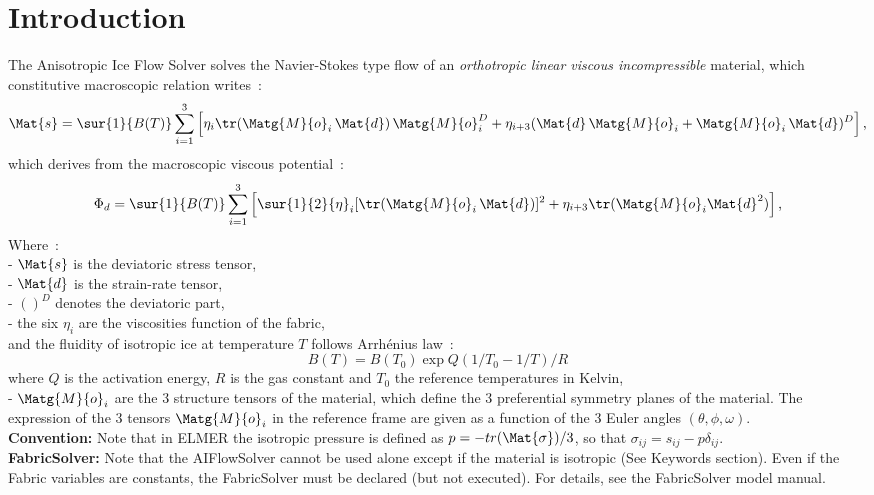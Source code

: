 \section{Introduction}
The Anisotropic Ice Flow Solver solves the Navier-Stokes type flow of an \textit{orthotropic linear viscous
incompressible } material, which constitutive macroscopic relation writes~:
\begin{equation} \label{polylawinv}
\Mat{s} = \sur{1}{{B}(T)} \sum_{i=1}^3 \left[ {\eta}_i \tr(\Matg{M}{o}_i \,\Mat{d}) \, \Matg{M}{o}_i^D + {\eta}_{i+3} (
\Mat{d} \, \Matg{M}{o}_i + \Matg{M}{o}_i \, \Mat{d})^D \right] \textrm{,}
\end{equation}
which derives from the macroscopic viscous potential~:
\begin{equation}
{\Phi}_d =  \sur{1}{{B}(T)} \sum_{i=1}^3 \left[ \sur{1}{2} {\eta}_i [\tr(\Matg{M}{o}_i \,\Mat{d})]^2  + {\eta}_{i+3}
\tr(\Matg{M}{o}_i \Mat{d}^2)\right] \textrm{,}
\end{equation}
%
Where~:\\
- $\Mat{s}$ is the deviatoric stress tensor,\\
%
- $\Mat{d}$ is the strain-rate tensor,\\
%
- $()^D$ denotes the deviatoric part,\\
%
- the six $\eta_i$ are the viscosities function of the fabric, \\
and the fluidity of isotropic ice at temperature $T$ follows Arrh\'{e}nius law~:
\begin{equation} {B}(T) = {B} (T_0) \exp{{Q}({1}/{T_0}-{1}/{T})/R}
\end{equation}
 where
$Q$ is the activation energy, $R$ is the gas constant and  $T_0$ the reference temperatures in Kelvin,\\
%
- $\Matg{M}{o}_i$ are the 3 structure tensors of the material, which define the 3 preferential symmetry planes of the
material. The expression of the 3 tensors $\Matg{M}{o}_i$ in the reference frame are given as a function of the 3 Euler
angles $(\theta,\phi,\omega)$.\\

\noindent \textbf{Convention:} Note that in ELMER the isotropic pressure is defined as $p = - tr (\Mat{\sigma}) /3 $,
so that $\sigma_{ij} = s_{ij} - p \delta_{ij}$. \\

\noindent \textbf{FabricSolver:} Note that the AIFlowSolver cannot be used alone except if the material is isotropic (See Keywords section). Even if the Fabric variables are constants, the FabricSolver must be declared (but not executed). For
details, see the FabricSolver model manual.\\

